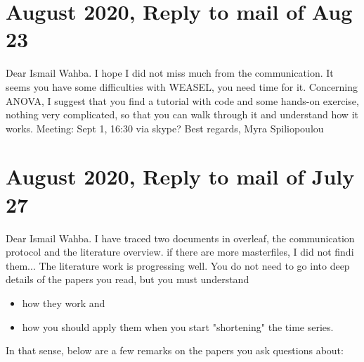 \documentclass{article}
\begin{document}
\section*{\texorpdfstring{}. August 2020, Reply to mail of Aug 23}
Dear Ismail Wahba.\newline
I hope I did not miss much from the communication. It seems you have some difficulties with WEASEL, you need time for it.\newline
Concerning ANOVA, I suggest that you find a tutorial with code and some hands-on exercise, nothing very complicated, so that you can walk through it and understand how it works.\newline
Meeting: Sept 1, 16:30 via skype?\newline
Best regards,
Myra Spiliopoulou

\section*{\texorpdfstring{}. August 2020, Reply to mail of July 27}
Dear Ismail Wahba.
I have traced two documents in overleaf, the communication protocol and the literature overview. if there are more masterfiles, I did not findi them...\newline
The literature work is progressing well.
You do not need to go into deep details of the papers you read, but you must understand
	\begin{itemize}
		\item how they work and
		\item how you should apply them when you start "shortening" the time series.
	\end{itemize}
In that sense, below are a few remarks on the papers you ask questions about:
\end{document}
